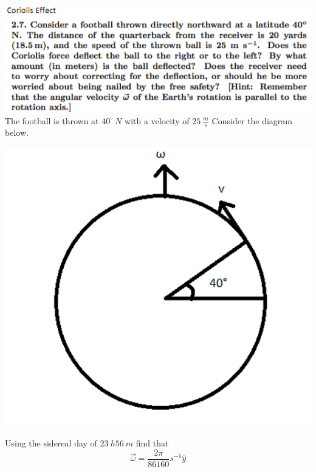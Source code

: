 \documentclass{article}
\begin{document}
\section{}
\includegraphics[scale = 0.8]{problemset1q3.PNG}
\newline\newline
The football is thrown at $40^{\circ}\: N$ with a velocity of $25\:\frac{m}{s}$
Consider the diagram below. 
\newline
\begin{center}
    \includegraphics[scale = 0.6]{problem5diagram.png}
\end{center}
Using the sidereal day of $23\:h 56\:m$ find that
\begin{equation}
    \vec{\omega} = \frac{2\pi}{86160}s^{-1}\hat{y}
\end{equation}
\end{document}
